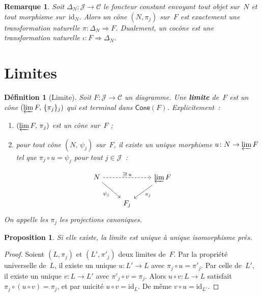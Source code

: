 \documentclass[a4paper,12pt]{book}
\newcommand{\id}{\mathrm{id}}
\newtheorem{proposition}[theoreme]{Proposition}
\newtheorem{definition}[theoreme]{Définition}
\newtheorem*{remarque}{Remarque}
\begin{document}
\begin{remarque}\label{rem:cone-transfo-nat}
Soit $\Delta_N \colon \mathcal{J}\to\mathcal{C}$ le foncteur constant
envoyant tout objet sur~$N$ et tout morphisme sur~$\id_N$.
Alors un cône $(N,\pi_j)$ sur~$F$ est exactement une transformation naturelle
$\pi\colon \Delta_N \Rightarrow F$.
Dualement, un cocône est une transformation naturelle $\iota\colon F\Rightarrow\Delta_N$.
\end{remarque}


\section{Limites}\label{sec:limites}

\begin{definition}[Limite]\label{def:limite}
Soit $F\colon\mathcal{J}\to\mathcal{C}$ un diagramme.
Une \textbf{limite} de~$F$ est un cône $(\varprojlim F,\,\{\pi_j\}_{j})$
qui est \emph{terminal} dans $\mathsf{Cone}(F)$.
Explicitement~:
\begin{enumerate}[label=(\alph*)]
\item $(\varprojlim F,\,\pi_j)$ est un cône sur~$F$ ;
\item pour tout cône $(N,\,\psi_j)$ sur~$F$, il existe un
      \emph{unique} morphisme $u\colon N\to\varprojlim F$
      tel que $\pi_j\circ u = \psi_j$ pour tout $j\in\mathcal{J}$~:
\end{enumerate}
\[
\begin{tikzcd}
N \arrow[dr, "\psi_j"'] \arrow[rr, dashed, "\exists!\, u"] & & \varprojlim F \arrow[dl, "\pi_j"] \\
& F_j &
\end{tikzcd}
\]
On appelle les $\pi_j$ les \emph{projections canoniques}.
\end{definition}

\begin{proposition}\label{prop:limite-unique}
Si elle existe, la limite est unique à unique isomorphisme près.
\end{proposition}

\begin{proof}
Soient $(L,\pi_j)$ et $(L',\pi'_j)$ deux limites de~$F$.
Par la propriété universelle de~$L$, il existe un unique $u\colon L'\to L$
avec $\pi_j\circ u = \pi'_j$. Par celle de~$L'$, il existe un unique
$v\colon L\to L'$ avec $\pi'_j\circ v = \pi_j$.
Alors $u\circ v\colon L\to L$ satisfait $\pi_j\circ(u\circ v)=\pi_j$,
et par unicité $u\circ v = \id_L$. De même $v\circ u = \id_{L'}$.
\end{proof}
\end{document}
